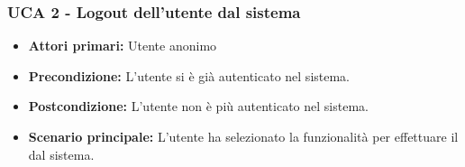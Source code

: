 \subsubsection{UCA 2 - Logout dell'utente dal sistema}%
\begin{itemize}
\item \textbf{Attori primari:} Utente anonimo
\item \textbf{Precondizione:} L'utente si è già autenticato nel sistema.
\item \textbf{Postcondizione:}  L'utente non è più autenticato nel sistema.
\item \textbf{Scenario principale:} L'utente ha selezionato la funzionalità per effettuare il  dal sistema.
\end{itemize}